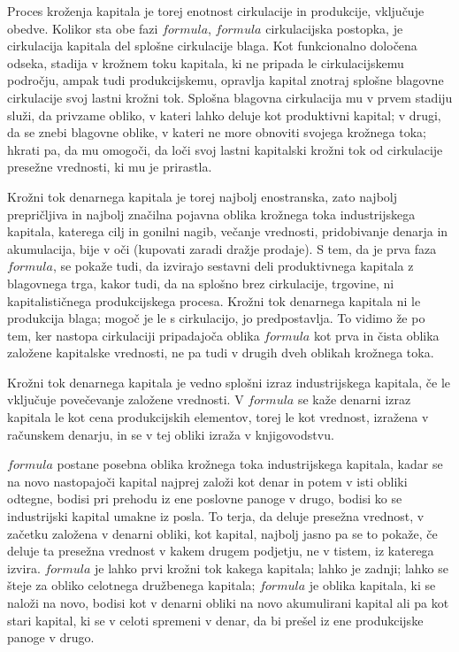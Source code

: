 \documentclass[kapital_02.tex]{subfiles}
\begin{document}
Proces kroženja kapitala je torej enotnost cirkulacije in produkcije, vključuje obedve. Kolikor sta obe fazi \( formula \), \( formula \) cirkulacijska postopka, je cirkulacija kapitala del splošne cirkulacije blaga. Kot funkcionalno določena odseka, stadija v krožnem toku kapitala, ki ne pripada le cirkulacijskemu področju, ampak tudi produkcijskemu, opravlja kapital znotraj splošne blagovne cirkulacije svoj lastni krožni tok. Splošna blagovna cirkulacija mu v prvem stadiju služi, da privzame obliko, v kateri lahko deluje kot produktivni kapital; v drugi, da se znebi blagovne oblike, v kateri ne more obnoviti svojega krožnega toka; hkrati pa, da mu omogoči, da loči svoj lastni kapitalski krožni tok od cirkulacije presežne vrednosti, ki mu je prirastla.

Krožni tok denarnega kapitala je torej najbolj enostranska, zato najbolj prepričljiva in najbolj značilna pojavna oblika krožnega toka industrijskega kapitala, katerega cilj in gonilni nagib, večanje vrednosti, pridobivanje denarja in akumulacija, bije v oči (kupovati zaradi dražje prodaje). S tem, da je prva faza \( formula \), se pokaže tudi, da izvirajo sestavni deli produktivnega kapitala z blagovnega trga, kakor tudi, da na splošno brez cirkulacije, trgovine, ni kapitalističnega produkcijskega procesa. Krožni tok denarnega kapitala ni le produkcija blaga; mogoč je le s cirkulacijo, jo predpostavlja. To vidimo že po tem, ker nastopa cirkulaciji pripadajoča oblika \( formula \) kot prva in čista oblika založene kapitalske vrednosti, ne pa tudi v drugih dveh oblikah krožnega toka.

Krožni tok denarnega kapitala je vedno splošni izraz industrijskega kapitala, če le vključuje povečevanje založene vrednosti. V \( formula \) se kaže denarni izraz kapitala le kot cena produkcijskih elementov, torej le kot vrednost, izražena v računskem denarju, in se v tej obliki izraža v knjigovodstvu.

\( formula \) postane posebna oblika krožnega toka industrijskega kapitala, kadar se na novo nastopajoči kapital najprej založi kot denar in potem v isti obliki odtegne, bodisi pri prehodu iz ene poslovne panoge v drugo, bodisi ko se industrijski kapital umakne iz posla. To terja, da deluje presežna vrednost, v začetku založena v denarni obliki, kot kapital, najbolj jasno pa se to pokaže, če deluje ta presežna vrednost v kakem drugem podjetju, ne v tistem, iz katerega izvira. \( formula \) je lahko prvi krožni tok kakega kapitala; lahko je zadnji; lahko se šteje za obliko celotnega družbenega kapitala; \( formula \) je oblika kapitala, ki se naloži na novo, bodisi kot v denarni obliki na novo akumulirani kapital ali pa kot stari kapital, ki se v celoti spremeni v denar, da bi prešel iz ene produkcijske panoge v drugo.
\end{document}
